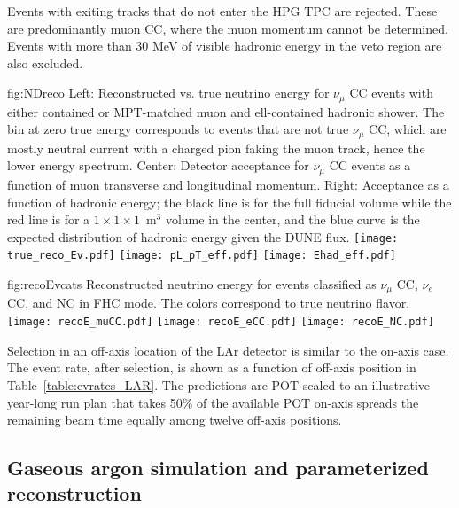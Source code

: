 Events with exiting tracks that do not enter the HPG TPC are rejected. These are predominantly muon CC, where the muon momentum cannot be determined. Events with more than 30 MeV of visible hadronic energy in the veto region are also excluded.

\begin{dunefigure}[ND reconstruction]{fig:NDreco}
{Left: Reconstructed vs. true neutrino energy for $\nu_{\mu}$ CC events with either contained or MPT-matched muon and ell-contained hadronic shower. The bin at zero true energy corresponds to events that are not true $\nu_{\mu}$ CC, which are mostly neutral current with a charged pion faking the muon track, hence the lower energy spectrum. Center: Detector acceptance for $\nu_{\mu}$ CC events as a function of muon transverse and longitudinal momentum. Right: Acceptance as a function of hadronic energy; the black line is for the full fiducial volume while the red line is for a $1 \times 1 \times 1$~m$^{3}$ volume in the center, and the blue curve is the expected distribution of hadronic energy given the DUNE flux.}
 \texttt{[image: true\_reco\_Ev.pdf]}
 \texttt{[image: pL\_pT\_eff.pdf]}
 \texttt{[image: Ehad\_eff.pdf]}
\end{dunefigure}

\begin{dunefigure}{fig:recoEvcats}
{Reconstructed neutrino energy for events classified as $\nu_{\mu}$ CC, $\nu_{e}$ CC, and NC in FHC mode. The colors correspond to true neutrino flavor.}
 \texttt{[image: recoE\_muCC.pdf]}
 \texttt{[image: recoE\_eCC.pdf]}
 \texttt{[image: recoE\_NC.pdf]}
\end{dunefigure}

Selection in an off-axis location of the LAr detector is similar to the on-axis case. The event rate, after selection, is shown as a function of off-axis position in Table~\ref{table:evrates_LAR}.  The predictions are POT-scaled to an illustrative year-long run plan that takes 50\% of the available POT on-axis spreads the remaining beam time equally among  twelve off-axis positions.  

\subsection{Gaseous argon simulation and parameterized reconstruction}
\label{sec:garndsimreco}


